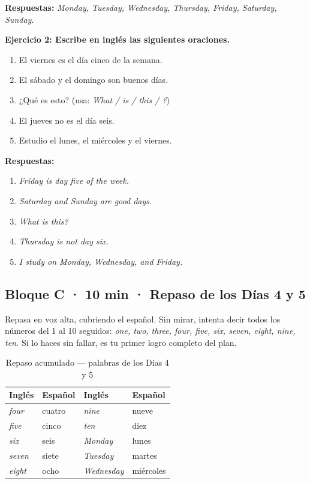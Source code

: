 \bigskip
\noindent
\textbf{Respuestas:}
\textit{Monday, Tuesday, Wednesday, Thursday, Friday, Saturday, Sunday.}

\bigskip
\noindent
\textbf{Ejercicio 2: Escribe en inglés las siguientes oraciones.}

\begin{enumerate}
  \item El viernes es el día cinco de la semana.
  \item El sábado y el domingo son buenos días.
  \item ¿Qué es esto? (usa: \textit{What / is / this / ?})
  \item El jueves no es el día seis.
  \item Estudio el lunes, el miércoles y el viernes.
\end{enumerate}

\medskip
\noindent
\textbf{Respuestas:}
\begin{enumerate}
  \item \textit{Friday is day five of the week.}
  \item \textit{Saturday and Sunday are good days.}
  \item \textit{What is this?}
  \item \textit{Thursday is not day six.}
  \item \textit{I study on Monday, Wednesday, and Friday.}
\end{enumerate}

\subsection*{Bloque C · 10 min · Repaso de los Días 4 y 5}

\noindent
Repasa en voz alta, cubriendo el español. Sin mirar, intenta
decir todos los números del 1 al 10 seguidos:
\textit{one, two, three, four, five, six, seven, eight, nine, ten.}
Si lo haces sin fallar, es tu primer logro completo del plan.

\begin{table}[htbp]
  \centering
  \caption{Repaso acumulado — palabras de los Días 4 y 5}
  \label{tab:repaso_dia6}
  \small
  \begin{tabular}{@{}llll@{}}
    \toprule
    \textbf{Inglés} & \textbf{Español} &
    \textbf{Inglés} & \textbf{Español} \\
    \midrule
    \textit{four}      & cuatro    & \textit{nine}      & nueve \\
    \textit{five}      & cinco     & \textit{ten}       & diez \\
    \textit{six}       & seis      & \textit{Monday}    & lunes \\
    \textit{seven}     & siete     & \textit{Tuesday}   & martes \\
    \textit{eight}     & ocho      & \textit{Wednesday} & miércoles \\
    \bottomrule
  \end{tabular}
\end{table}

